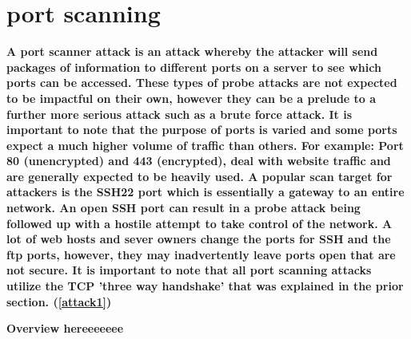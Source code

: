 \section{port scanning}

\textbf{A port scanner attack is an attack whereby the attacker will send packages of information to different ports on a server to see which ports can be accessed. These types of probe attacks are not expected to be impactful on their own, however they can be a prelude to a further more serious attack such as a brute force attack. It is important to note that the purpose of ports is varied and some ports expect a much higher volume of traffic than others. For example: Port 80 (unencrypted) and 443 (encrypted), deal with website traffic and are generally expected to be heavily used. A popular scan target for attackers is the SSH22 port which is essentially a gateway to an entire network. An open SSH port can result in a probe attack being followed up with a hostile attempt to take control of the network. A lot of web hosts and sever owners change the ports for SSH and the ftp ports, however, they may inadvertently leave ports open that are not secure. It is important to note that all port scanning attacks utilize the TCP 'three way handshake' that was explained in the prior section. (\ref{attack1})}

\textbf{Overview hereeeeeee}

